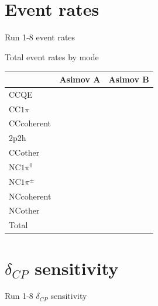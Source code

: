 \documentclass{beamer}
\newcommand{\deltacp}{$\delta_{CP}$\xspace}
\begin{document}
\section{Event rates}
\begin{frame}
	\centering
	\Large Run 1-8 event rates
\end{frame}

\begin{frame}{Total event rates by mode}
	\centering
	\begin{tabular}{ | l || r | r | }
		\hline
	    				&	Asimov A	&	Asimov B	\\\hline\hline
	 	CCQE    		& 	&	\\ \hline
		CC$1\pi$		&	&	\\ \hline
		CCcoherent		&	&	\\ \hline
		2p2h			&	&	\\ \hline
		CCother			&	&	\\ \hline
		NC$1\pi^0$		&	&	\\ \hline
		NC$1\pi^\pm$	&	&	\\ \hline
		NCcoherent		&	&	\\ \hline
		NCother			&	&	\\ \hline
		\hline
		Total			&	&	\\ \hline
	\end{tabular}
\end{frame}

\section{\deltacp sensitivity}
\begin{frame}
	\centering
	\Large Run 1-8 \deltacp sensitivity\\
\end{frame}
\end{document}
